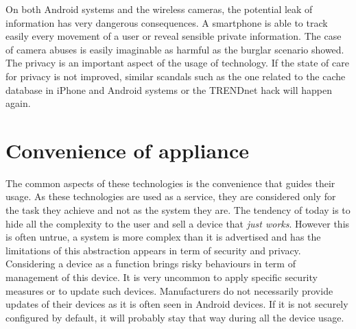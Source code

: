 On both Android systems and the wireless cameras, the potential leak of information has very dangerous consequences.
A smartphone is able to track easily every movement of a user or reveal sensible private information.
The case of camera abuses is easily imaginable as harmful as the burglar scenario showed.\\

The privacy is an important aspect of the usage of technology.
If the state of care for privacy is not improved, similar scandals such as the one related to the cache database in iPhone and Android systems or the TRENDnet hack will happen again.

\section{Convenience of appliance}

The common aspects of these technologies is the convenience that guides their usage.
As these technologies are used as a service, they are considered only for the task they achieve and not as the system they are.
The tendency of today is to hide all the complexity to the user and sell a device that \emph{just works}.
However this is often untrue, a system is more complex than it is advertised and has the limitations of this abstraction appears in term of security and privacy.\\

Considering a device as a function brings risky behaviours in term of management of this device.
It is very uncommon to apply specific security measures or to update such devices.
Manufacturers do not necessarily provide updates of their devices as it is often seen in Android devices.
If it is not securely configured by default, it will probably stay that way during all the device usage.


